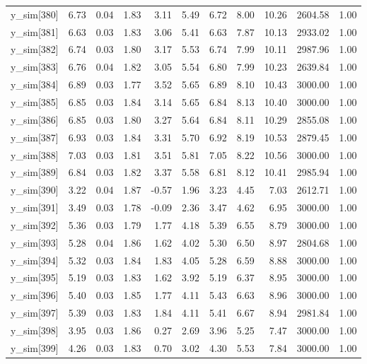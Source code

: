 \begin{table}[ht]
\begin{tabular}{rrrrrrrrrrr}
  y\_sim[380] & 6.73 & 0.04 & 1.83 & 3.11 & 5.49 & 6.72 & 8.00 & 10.26 & 2604.58 & 1.00 \\ 
  y\_sim[381] & 6.63 & 0.03 & 1.83 & 3.06 & 5.41 & 6.63 & 7.87 & 10.13 & 2933.02 & 1.00 \\ 
  y\_sim[382] & 6.74 & 0.03 & 1.80 & 3.17 & 5.53 & 6.74 & 7.99 & 10.11 & 2987.96 & 1.00 \\ 
  y\_sim[383] & 6.76 & 0.04 & 1.82 & 3.05 & 5.54 & 6.80 & 7.99 & 10.23 & 2639.84 & 1.00 \\ 
  y\_sim[384] & 6.89 & 0.03 & 1.77 & 3.52 & 5.65 & 6.89 & 8.10 & 10.43 & 3000.00 & 1.00 \\ 
  y\_sim[385] & 6.85 & 0.03 & 1.84 & 3.14 & 5.65 & 6.84 & 8.13 & 10.40 & 3000.00 & 1.00 \\ 
  y\_sim[386] & 6.85 & 0.03 & 1.80 & 3.27 & 5.64 & 6.84 & 8.11 & 10.29 & 2855.08 & 1.00 \\ 
  y\_sim[387] & 6.93 & 0.03 & 1.84 & 3.31 & 5.70 & 6.92 & 8.19 & 10.53 & 2879.45 & 1.00 \\ 
  y\_sim[388] & 7.03 & 0.03 & 1.81 & 3.51 & 5.81 & 7.05 & 8.22 & 10.56 & 3000.00 & 1.00 \\ 
  y\_sim[389] & 6.84 & 0.03 & 1.82 & 3.37 & 5.58 & 6.81 & 8.12 & 10.41 & 2985.94 & 1.00 \\ 
  y\_sim[390] & 3.22 & 0.04 & 1.87 & -0.57 & 1.96 & 3.23 & 4.45 & 7.03 & 2612.71 & 1.00 \\ 
  y\_sim[391] & 3.49 & 0.03 & 1.78 & -0.09 & 2.36 & 3.47 & 4.62 & 6.95 & 3000.00 & 1.00 \\ 
  y\_sim[392] & 5.36 & 0.03 & 1.79 & 1.77 & 4.18 & 5.39 & 6.55 & 8.79 & 3000.00 & 1.00 \\ 
  y\_sim[393] & 5.28 & 0.04 & 1.86 & 1.62 & 4.02 & 5.30 & 6.50 & 8.97 & 2804.68 & 1.00 \\ 
  y\_sim[394] & 5.32 & 0.03 & 1.84 & 1.83 & 4.05 & 5.28 & 6.59 & 8.88 & 3000.00 & 1.00 \\ 
  y\_sim[395] & 5.19 & 0.03 & 1.83 & 1.62 & 3.92 & 5.19 & 6.37 & 8.95 & 3000.00 & 1.00 \\ 
  y\_sim[396] & 5.40 & 0.03 & 1.85 & 1.77 & 4.11 & 5.43 & 6.63 & 8.96 & 3000.00 & 1.00 \\ 
  y\_sim[397] & 5.39 & 0.03 & 1.83 & 1.84 & 4.11 & 5.41 & 6.67 & 8.94 & 2981.84 & 1.00 \\ 
  y\_sim[398] & 3.95 & 0.03 & 1.86 & 0.27 & 2.69 & 3.96 & 5.25 & 7.47 & 3000.00 & 1.00 \\ 
  y\_sim[399] & 4.26 & 0.03 & 1.83 & 0.70 & 3.02 & 4.30 & 5.53 & 7.84 & 3000.00 & 1.00 \\ 

\end{tabular}
\end{table}
